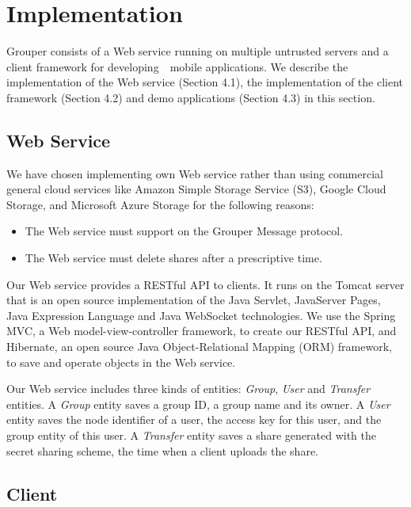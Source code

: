 \documentclass[twocolumn,10pt]{article}
\begin{document}
\section{Implementation}

Grouper consists of a Web service running on multiple untrusted servers and a client framework for developing　mobile applications.
We describe the implementation of the Web service (Section 4.1), the implementation of the client framework (Section 4.2) and demo applications (Section 4.3) in this section.

\subsection{Web Service}

We have chosen implementing own Web service rather than using commercial general cloud services like Amazon Simple Storage Service (S3), Google Cloud Storage, and Microsoft Azure Storage for the following reasons:

\begin{itemize}
	\setlength{\itemsep}{1pt}
	\setlength{\parskip}{0pt}
	\setlength{\parsep}{0pt}
	\item The Web service must support on the Grouper Message protocol.
	\item The Web service must delete shares after a prescriptive time.
\end{itemize}

Our Web service provides a RESTful API to clients.
It runs on the Tomcat server that is an open source implementation of the Java Servlet, JavaServer Pages, Java Expression Language and Java WebSocket technologies\cite{tomcat}. 
We use the Spring MVC, a  Web model-view-controller framework, to create our RESTful API\cite{spring}, and Hibernate, an open source Java Object-Relational Mapping (ORM) framework, to save and operate objects in the Web service\cite{hibernate}. 

Our Web service includes three kinds of entities: \emph{Group}, \emph{User} and \emph{Transfer} entities. 
A \emph{Group} entity saves a group ID, a group name and its owner. 
A \emph{User} entity saves the node identifier of a user, the access key for this user, and the group entity of this user. 
A \emph{Transfer} entity saves a share generated with the secret sharing scheme, the time when a client uploads the share. 

\subsection{Client}
\end{document}
